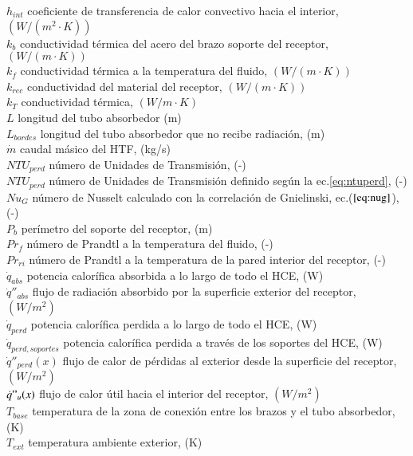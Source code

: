 \begin{tabbing}
$h_{int}$ \> coeficiente de transferencia de calor convectivo hacia el interior, $(W/(m^{2}\cdot K))$ \\
$k_b$ \> conductividad térmica del acero del brazo soporte del receptor,  $(W/(m\cdot K))$ \\
$k_f$ \> conductividad térmica a la temperatura del fluido, $(W/(m\cdot K))$ \\
$k_{rec}$ \> conductividad del material del receptor, $(W/(m\cdot K))$ \\
$k_T$ \> conductividad térmica, $(W/m \cdot K)$ \\
$L$  \> longitud del tubo absorbedor (m) \\
$L_{bordes}$  \> longitud del tubo absorbedor que no recibe radiación, (m) \\
$\dot m$ \> caudal másico del HTF, (kg/s) \\
$NTU_{perd}$ \> número de Unidades de Transmisión, (-) \\
$NTU_{perd}$ \> número de Unidades de Transmisión definido según la ec.\eqref{eq:ntuperd}, (-) \\
$Nu_{G}$ \> número de Nusselt calculado con la correlación de Gnielinski, ec.($\eqref{eq:nug}$), (-) \\
$P_b$ \> perímetro del soporte del receptor, (m) \\
$Pr_f$ \> número de Prandtl a la temperatura del fluido, (-) \\
$Pr_{ri}$ \> número de Prandtl a la temperatura de la pared interior del receptor, (-) \\
$\dot q_{abs}$ \> potencia calorífica absorbida a lo largo de todo el HCE, (W) \\
$\dot q''_{abs}$ \> flujo de radiación absorbido por la superficie exterior del receptor, $(W/m^{2})$ \\
$\dot q_{perd}$ \> potencia calorífica perdida a lo largo de todo el HCE, (W) \\
$\dot q_{perd,soportes}$ \> potencia calorífica perdida a través de los soportes del HCE, (W) \\
$\dot q''_{perd}(x)$ \> flujo de calor de pérdidas al exterior desde la superficie del receptor, $(W/m^{2})$ \\
$\dot q"_{u}(x)$ \> flujo de calor útil hacia el interior del receptor,  $(W/m^{2})$ \\ 
$T_{base}$ \> temperatura de la zona de conexión entre los brazos y el tubo absorbedor, (K) \\
$T_{ext}$ \> temperatura ambiente exterior, (K) \\

\end{tabbing}
